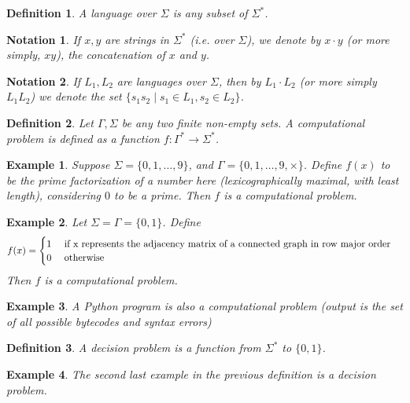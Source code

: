 \documentclass[a4paper]{article}
\newtheorem{defn}{Definition}
\newtheorem{notn}{Notation}
\newtheorem{eg}{Example}
\begin{document}
\begin{defn}
    A language over $\Sigma$ is any subset of $\Sigma^*$.
\end{defn}

\begin{notn}
    If $x, y$ are strings in $\Sigma^*$ (i.e. over $\Sigma$), we denote by $x \cdot y$ (or more simply, $xy$), the concatenation of $x$ and $y$.
\end{notn}
\begin{notn}
    If $L_1, L_2$ are languages over $\Sigma$, then by $L_1 \cdot L_2$ (or more simply $L_1 L_2$) we denote the set $\{s_1 s_2 \mid s_1 \in L_1, s_2 \in L_2\}$.
\end{notn}

\begin{defn}
    Let $\Gamma, \Sigma$ be any two finite non-empty sets. A computational problem is defined as a function $f : \Gamma^* \to \Sigma^*$.
\end{defn}

\begin{eg}
    Suppose $\Sigma = \{0, 1, \ldots, 9\}$, and $\Gamma = \{0, 1, \ldots, 9, \times\}$.
    Define $f(x)$ to be the prime factorization of a number here (lexicographically maximal, with least length), considering $0$ to be a prime.
    Then $f$ is a computational problem.
\end{eg}

\begin{eg}
    Let $\Sigma = \Gamma = \{0, 1\}$. Define 
    \begin{align*}
        f(x) = \begin{cases}
            1 \quad \text{ if } $x$ \text{ represents the adjacency matrix of a connected graph in row major order}\\
            0 \quad \text{ otherwise}
        \end{cases}
    \end{align*}
    Then $f$ is a computational problem.
\end{eg}

\begin{eg}
    A Python program is also a computational problem (output is the set of all possible bytecodes and syntax errors)
\end{eg}

\begin{defn}
    A decision problem is a function from $\Sigma^*$ to $\{0, 1\}$.
\end{defn}

\begin{eg}
    The second last example in the previous definition is a decision problem.
\end{eg}
\end{document}
